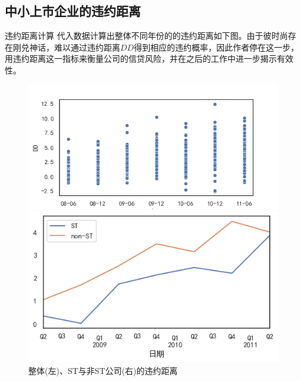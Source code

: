 \documentclass{ctexbeamer}
\begin{document}
\subsection{中小上市企业的违约距离}
\begin{frame}{违约距离计算}
    代入数据计算出整体不同年份的的违约距离如下图。由于彼时尚存在刚兑神话，难以通过违约距离$DD$得到相应的违约概率，因此作者停在这一步，用违约距离这一指标来衡量公司的信贷风险，并在之后的工作\cite{彭伟2012我国上市中小企业信贷风险研究}中进一步揭示有效性。
    \begin{figure}
        \begin{minipage}{0.48\linewidth}
            \includegraphics[width=\linewidth]{img/dd.png}
        \end{minipage}
        \begin{minipage}{0.48\linewidth}
            \includegraphics[width=\linewidth]{img/st-vs-non-st.png}
        \end{minipage}
        \caption{整体(左)、ST与非ST公司(右)的违约距离}
    \end{figure}
\end{frame}
\end{document}
